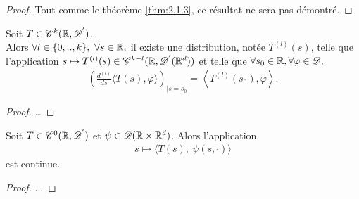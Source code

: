 \documentclass[french,a4paper,10pt]{article}
\begin{document}
            \begin{proof}
                Tout comme le théorème \ref{thm:2.1.3}, ce résultat ne sera pas démontré.
            \end{proof}
            
            \begin{proposition}\label{prop:2.2.5}
                Soit $T \in \mathscr{C}^k(\mathbb{R},\mathscr{D^{'}})$. \\
                Alors $\forall l \in \{0,..,k \}, \ \forall s \in \mathbb{R},$ il existe une distribution, notée $T^{(l)}(s)$, telle que l'application $s \mapsto T^{(l)}(s) \in \mathscr{C}^{k-l}(\mathbb{R},\mathscr{D^{'}}(\mathbb{R}^d))$ et telle que $\forall s_0 \in \mathbb{R}, \forall \varphi \in \mathscr{D},$
                \begin{equation*}
                    \begin{aligned}
                        {\left( \frac{d^{(l)}}{ds} \langle T(s), \varphi \rangle \right)}_{|s = s_0} = \left\langle T^{(l)}(s_0), \varphi \right\rangle.
                    \end{aligned}
                \end{equation*}
            \end{proposition}

            \begin{proof}
                \dots
            \end{proof}

            \begin{proposition}\label{prop:2.2.6}
                Soit $T \in \mathscr{C}^0(\mathbb{R},\mathscr{D^{'}})$ et $\psi \in \mathscr{D}(\mathbb{R} \times \mathbb{R}^d)$. Alors l'application
                \begin{equation*}
                    \begin{aligned}
                        s \longmapsto {\langle T(s),\ \psi(s,\cdot) \rangle}
                    \end{aligned}
                \end{equation*}
                est continue.
            \end{proposition}

            \begin{proof}
                ...
            \end{proof}
\end{document}
